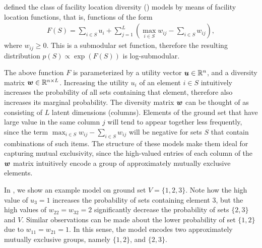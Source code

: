 \begin{example}[\flid{}] \label{ex:flid}
\cite{tschiatschek16} defined the class of facility location diversity (\flid) models by means of facility location functions, that is, functions of the form
\begin{align*}
F(S) = \sum_{i \in S} u_i + \sum_{j=1}^{L} \left(\max_{i \in S} w_{ij} - \sum_{i \in S} w_{ij}\right),
\end{align*}
where $w_{ij} \geq 0$.
This is a submodular set function, therefore the resulting distribution $p(S) \propto \exp(F(S))$ is log-submodular.

The above function $F$ is parameterized by a utility vector $\bm{u} \in \mathbb{R}^n$, and a diversity matrix $\bm{w} \in \mathbb{R}^{n\times L}$.
Increasing the utility $u_i$ of an element $i \in S$ intuitively increases the probability of all sets containing that element, therefore also increases its marginal probability.
The diversity matrix $\bm{w}$ can be thought of as consisting of $L$ latent dimensions (columns).
Elements of the ground set that have large value in the same column $j$ will tend to appear together less frequently, since the term $\max_{i \in S} w_{ij} - \sum_{i \in S} w_{ij}$ will be negative for sets $S$ that contain combinations of such items.
The structure of these models make them ideal for capturing mutual exclusivity, since the high-valued entries of each column of the $\bm{w}$ matrix intuitively encode a group of approximately mutually exclusive elements.

In , we show an example \flid{} model on ground set $V = \{1, 2, 3\}$.
Note how the high value of $u_3 = 1$ increases the probability of sets containing element $3$, but the high values of $w_{22} = w_{32} = 2$ significantly decrease the probability of sets $\{2, 3\}$ and $V$.
Similar observations can be made about the lower probability of set $\{1, 2\}$ due to $w_{11} = w_{21} = 1$.
In this sense, the model encodes two approximately mutually exclusive groups, namely $\{1, 2\}$, and $\{2, 3\}$.


\end{example}
